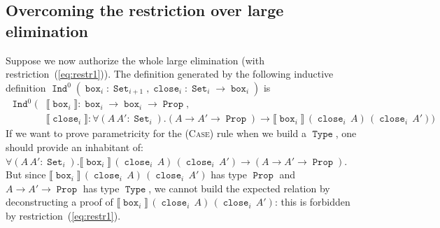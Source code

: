 \documentclass[a4paper,USenglish]{lipics}
\DeclareMathOperator{\Prop}{\mathtt{Prop}}
\DeclareMathOperator{\Type}{\mathtt{Type}}
\DeclareMathOperator{\Set}{\mathtt{Set}}
\DeclareMathOperator{\Ind}{\mathtt{Ind}}
\DeclareMathOperator{\Boxy}{\mathtt{box}}
\DeclareMathOperator{\Close}{\mathtt{close}}
\begin{document}
\subsection{\label{OvercomeWE}Overcoming the restriction over large
  elimination}

Suppose we now authorize the whole large elimination (with
restriction~(\ref{eq:restr1})). The definition generated by the following
inductive definition $\Ind^0(\Boxy_i : \Set_{i+1}, \Close_i : \Set_i → \Boxy_i)$ is
\begin{align*}
\Ind^0\big(&⟦\Boxy_i⟧ : \Boxy_i → \Boxy_i → \Prop, \\
       & ⟦\Close_i⟧ : ∀(A\,A':\Set_i).(A → A' → \Prop) →
 ⟦\Boxy_i⟧\,(\Close_i\,A)\,(\Close_i\,A')\big)
\end{align*}
If we want to prove parametricity for the (\textsc{Case}) rule when we
build a $\Type$, one should provide an inhabitant of:
$∀(A\,A':\Set_i).⟦\Boxy_i⟧\,(\Close_i\,A)\,(\Close_i\,A') → (A → A' → \Prop)$.
But since $⟦\Boxy_i⟧\,(\Close_i\,A)\,(\Close_i\,A')$ has type $\Prop$ and $A →
A' → \Prop$ has type $\Type$, we cannot build the expected relation by
deconstructing a proof of $⟦\Boxy_i⟧\,(\Close_i\,A)\,(\Close_i\,A')$: this is
forbidden by restriction~(\ref{eq:restr1}).
\end{document}

